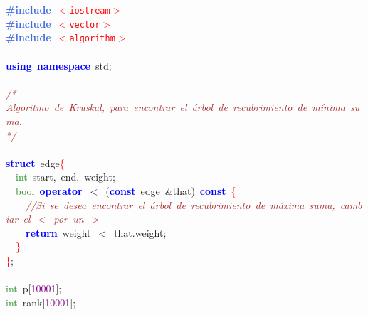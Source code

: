 
{\ttfamily \raggedright {
\noindent
\mbox{}\textbf{\textcolor{RoyalBlue}{\#include}}\ \texttt{\textcolor{Red}{$<$iostream$>$}} \\
\mbox{}\textbf{\textcolor{RoyalBlue}{\#include}}\ \texttt{\textcolor{Red}{$<$vector$>$}} \\
\mbox{}\textbf{\textcolor{RoyalBlue}{\#include}}\ \texttt{\textcolor{Red}{$<$algorithm$>$}} \\
\mbox{} \\
\mbox{}\textbf{\textcolor{Blue}{using}}\ \textbf{\textcolor{Blue}{namespace}}\ std\textcolor{BrickRed}{;} \\
\mbox{} \\
\mbox{}\textit{\textcolor{Brown}{/*}} \\
\mbox{}\textit{\textcolor{Brown}{Algoritmo\ de\ Kruskal,\ para\ encontrar\ el\ árbol\ de\ recubrimiento\ de\ mínima\ suma.}} \\
\mbox{}\textit{\textcolor{Brown}{*/}} \\
\mbox{} \\
\mbox{}\textbf{\textcolor{Blue}{struct}}\ edge\textcolor{Red}{\{} \\
\mbox{}\ \ \textcolor{ForestGreen}{int}\ start\textcolor{BrickRed}{,}\ end\textcolor{BrickRed}{,}\ weight\textcolor{BrickRed}{;} \\
\mbox{}\ \ \textcolor{ForestGreen}{bool}\ \textbf{\textcolor{Blue}{operator}}\ \textcolor{BrickRed}{$<$}\ \textcolor{BrickRed}{(}\textbf{\textcolor{Blue}{const}}\ edge\ \textcolor{BrickRed}{\&}that\textcolor{BrickRed}{)}\ \textbf{\textcolor{Blue}{const}}\ \textcolor{Red}{\{} \\
\mbox{}\ \ \ \ \textit{\textcolor{Brown}{//Si\ se\ desea\ encontrar\ el\ árbol\ de\ recubrimiento\ de\ máxima\ suma,\ cambiar\ el\ $<$\ por\ un\ $>$}} \\
\mbox{}\ \ \ \ \textbf{\textcolor{Blue}{return}}\ weight\ \textcolor{BrickRed}{$<$}\ that\textcolor{BrickRed}{.}weight\textcolor{BrickRed}{;} \\
\mbox{}\ \ \textcolor{Red}{\}} \\
\mbox{}\textcolor{Red}{\}}\textcolor{BrickRed}{;} \\
\mbox{} \\
\mbox{}\textcolor{ForestGreen}{int}\ p\textcolor{BrickRed}{[}\textcolor{Purple}{10001}\textcolor{BrickRed}{];} \\
\mbox{}\textcolor{ForestGreen}{int}\ rank\textcolor{BrickRed}{[}\textcolor{Purple}{10001}\textcolor{BrickRed}{];} \\
}}
